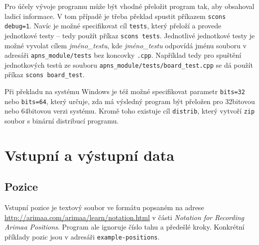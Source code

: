 \documentclass{article}
\begin{document}
Pro účely vývoje programu může být vhodné přeložit program tak, aby obsahoval ladicí informace. V tom případě je třeba
překlad spustit příkazem \verb+scons debug=1+. Navíc je možné specifikovat cíl \texttt{tests}, který přeloží a provede
jednotkové testy -- tedy použít příkaz \verb+scons tests+. Jednotlivé jednotkové testy je možné vyvolat cílem
\emph{jméno\_testu}, kde \emph{jméno\_testu} odpovídá jménu souboru v adresáři \texttt{apns\_module/tests} bez koncovky
\texttt{.cpp}. Například tedy pro spuštění jednotkových testů ze souboru \texttt{apns\_module/tests/board\_test.cpp} se
dá použít příkaz \verb+scons board_test+.

Při překladu na systému Windows je též možné specifikovat parametr \texttt{bits=32} nebo \texttt{bits=64}, který určuje,
zda má výsledný program být přeložen pro 32bitovou nebo 64bitovou verzi systému. Kromě toho existuje cíl
\texttt{distrib}, který vytvoří \texttt{zip} soubor s binární distribucí programu.

\section{Vstupní a výstupní data}
\subsection{Pozice}
Vstupní pozice je textový soubor ve formátu popsaném na adrese \url{http://arimaa.com/arimaa/learn/notation.html} v
části \emph{Notation for Recording Arimaa Positions}. Program ale ignoruje číslo tahu a předešlé kroky. Konkrétní příklady pozic
jsou v adresáři \texttt{example-positions}.
\end{document}
